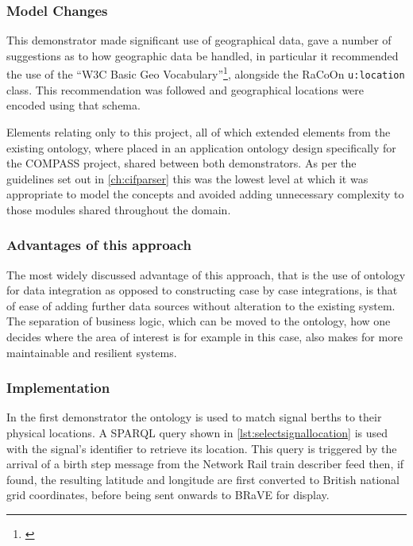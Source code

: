 \subsubsection{Model Changes}
This demonstrator made significant use of geographical data, \citet{Tutcher2015} gave a number of suggestions as to how geographic data be handled, in particular it recommended the use of the ``W3C Basic Geo Vocabulary''\footnote{\cite{Lieberman2007}}, alongside the RaCoOn \texttt{u:location} class. This recommendation was followed and geographical locations were encoded using that schema. 

Elements relating only to this project, all of which extended elements from the existing ontology, where placed in an application ontology design specifically for the COMPASS project, shared between both demonstrators. As per the guidelines set out in \autoref{ch:cifparser} this was the lowest level at which it was appropriate to model the concepts and avoided adding unnecessary complexity to those modules shared throughout the domain.

\subsubsection{Advantages of this approach}
The most widely discussed advantage of this approach, that is the use of ontology for data integration as opposed to constructing case by case integrations, is that of ease of adding further data sources without alteration to the existing system. The separation of business logic, which can be moved to the ontology, how one decides where the area of interest is for example in this case, also makes for more maintainable and resilient systems. 

\subsubsection{Implementation}
In the first demonstrator the ontology is used to match signal berths to their physical locations. A SPARQL query shown in \autoref{lst:selectsignallocation} is used with the signal's identifier to retrieve its location. This query is triggered by the arrival of a birth step message from the Network Rail train describer feed then, if found, the resulting latitude and longitude are first converted to British national grid coordinates, before being sent onwards to BRaVE for display. 

